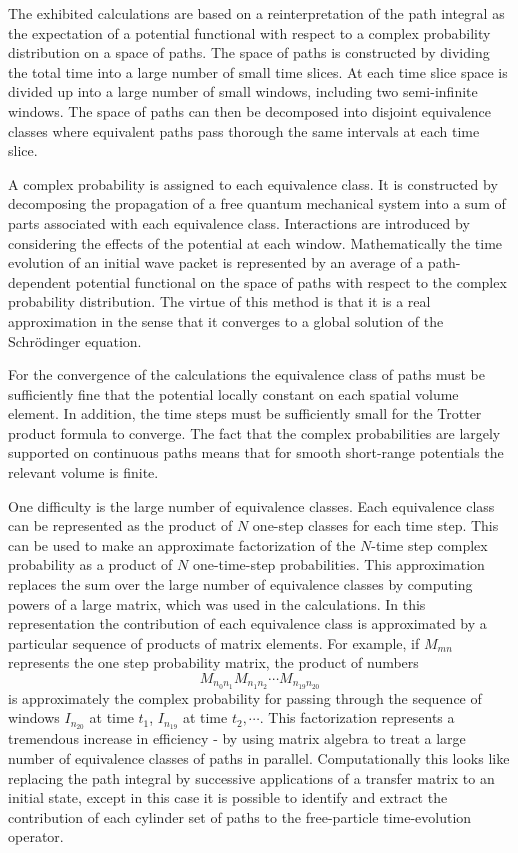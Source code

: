 \documentclass[aps,prc,reprint,noshowpacs,groupedaddress,onecolumn]{revtex4}
\def\beq{\begin{equation}}
\def\eeq{\end{equation}}
\begin{document}
The exhibited calculations are based on a reinterpretation of the
path integral as the expectation of a potential functional with
respect to a complex probability distribution on a space of paths.
The space of paths is constructed by dividing the total time into a
large number of small time slices.  At each time slice space is
divided up into a large number of small windows, including two
semi-infinite windows.  The space of paths can then be decomposed into
disjoint equivalence classes where equivalent paths pass thorough the
same intervals at each time slice.
 
A complex probability is assigned to each equivalence class.  It is
constructed by decomposing the propagation of a free quantum
mechanical system into a sum of parts associated with each equivalence
class. Interactions are introduced by considering the effects of the
potential at each window.  Mathematically the time evolution of an
initial wave packet is represented by an average of a path-dependent
potential functional on the space of paths with respect to the complex
probability distribution.  The virtue of this method is that
it is a real approximation in the sense that it converges to
a global solution of the Schr\"odinger equation.

For the convergence of the calculations the equivalence class of paths
must be sufficiently fine that the potential locally constant
on each spatial volume element.    In addition, the time
steps must be sufficiently small for the Trotter product formula to
converge.  The fact that the complex probabilities are largely
supported on continuous paths means that for smooth short-range
potentials the relevant volume is finite. 

One difficulty is the large number of equivalence classes.  Each
equivalence class can be represented as the product of $N$ 
one-step classes for each time step.  This can be used to make an
approximate factorization of the $N$-time step complex probability as
a product of $N$ one-time-step probabilities.  This approximation
replaces the sum over the large number of equivalence classes by
computing powers of a large matrix, which was used in the
calculations.  In this representation the contribution of
each equivalence class is approximated by a particular sequence of
products of matrix elements.  For example, if $M_{mn}$ represents
the one step probability matrix, the product of numbers
\beq
M_{n_0 n_1} M_{n_1 n_2} \cdots M_{n_{19} n_{20}} 
\label{con:1}
\eeq
is approximately the complex probability for passing through the
sequence of windows $I_{n_{20}}$ at time $t_1$, $I_{n_{19}}$ at time
$t_2, \cdots $.  This factorization represents a tremendous increase
in efficiency - by using matrix algebra to treat a large number of
equivalence classes of paths in parallel.  Computationally
this looks like replacing the
path integral by successive applications of a transfer matrix to an
initial state, except in this case it is possible to identify and
extract the contribution of each cylinder set of paths to the
free-particle time-evolution operator. 
\end{document}

